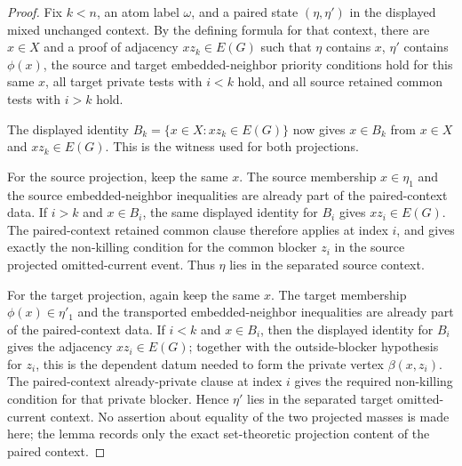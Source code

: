 \begin{proof}
Fix \(k<n\), an atom label \(\omega\), and a paired state
\((\eta,\eta')\) in the displayed mixed unchanged context.  By the defining
formula for that context, there are \(x\in X\) and a proof of adjacency
\(xz_k\in E(G)\) such that \(\eta\) contains \(x\), \(\eta'\) contains
\(\phi(x)\), the source and target embedded-neighbor priority conditions hold
for this same \(x\), all target private tests with \(i<k\) hold, and all
source retained common tests with \(i>k\) hold.

The displayed identity \(B_k=\{x\in X:xz_k\in E(G)\}\) now gives
\(x\in B_k\) from \(x\in X\) and \(xz_k\in E(G)\).  This is the witness used
for both projections.

For the source projection, keep the same \(x\).  The source membership
\(x\in\eta_1\) and the source embedded-neighbor inequalities are already part
of the paired-context data.  If \(i>k\) and \(x\in B_i\), the same displayed
identity for \(B_i\) gives \(xz_i\in E(G)\).  The paired-context retained
common clause therefore applies at index \(i\), and gives exactly the
non-killing condition for the common blocker \(z_i\) in the source projected
omitted-current event.  Thus \(\eta\) lies in the separated source context.

For the target projection, again keep the same \(x\).  The target membership
\(\phi(x)\in\eta'_1\) and the transported embedded-neighbor inequalities are
already part of the paired-context data.  If \(i<k\) and \(x\in B_i\), then
the displayed identity for \(B_i\) gives the adjacency \(xz_i\in E(G)\);
together with the outside-blocker hypothesis for \(z_i\), this is the
dependent datum needed to form the private vertex \(\beta(x,z_i)\).  The
paired-context already-private clause at index \(i\) gives the required
non-killing condition for that private blocker.  Hence \(\eta'\) lies in the
separated target omitted-current context.  No assertion about equality of the
two projected masses is made here; the lemma records only the exact
set-theoretic projection content of the paired context.
\end{proof}
